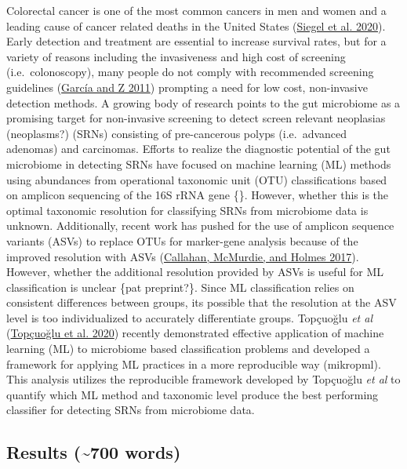 \documentclass[
]{article}
\begin{document}
Colorectal cancer is one of the most common cancers in men and women and
a leading cause of cancer related deaths in the United States
(\protect\hyperlink{ref-siegel2020}{Siegel et al. 2020}). Early
detection and treatment are essential to increase survival rates, but
for a variety of reasons including the invasiveness and high cost of
screening (i.e.~colonoscopy), many people do not comply with recommended
screening guidelines (\protect\hyperlink{ref-garcuxeda2011a}{García and
Z 2011}) prompting a need for low cost, non-invasive detection methods.
A growing body of research points to the gut microbiome as a promising
target for non-invasive screening to detect screen relevant neoplasias
(neoplasms?) (SRNs) consisting of pre-cancerous polyps (i.e.~advanced
adenomas) and carcinomas. Efforts to realize the diagnostic potential of
the gut microbiome in detecting SRNs have focused on machine learning
(ML) methods using abundances from operational taxonomic unit (OTU)
classifications based on amplicon sequencing of the 16S rRNA gene \{\}.
However, whether this is the optimal taxonomic resolution for
classifying SRNs from microbiome data is unknown. Additionally, recent
work has pushed for the use of amplicon sequence variants (ASVs) to
replace OTUs for marker-gene analysis because of the improved resolution
with ASVs (\protect\hyperlink{ref-callahan2017}{Callahan, McMurdie, and
Holmes 2017}). However, whether the additional resolution provided by
ASVs is useful for ML classification is unclear \{pat preprint?\}. Since
ML classification relies on consistent differences between groups, its
possible that the resolution at the ASV level is too individualized to
accurately differentiate groups. Topçuoğlu \emph{et al}
(\protect\hyperlink{ref-topuxe7uolu2020}{Topçuoğlu et al. 2020})
recently demonstrated effective application of machine learning (ML) to
microbiome based classification problems and developed a framework for
applying ML practices in a more reproducible way (mikropml). This
analysis utilizes the reproducible framework developed by Topçuoğlu
\emph{et al} to quantify which ML method and taxonomic level produce the
best performing classifier for detecting SRNs from microbiome data.

\hypertarget{results-700-words}{%
\subsection{Results (\textasciitilde700
words)}\label{results-700-words}}
\end{document}
